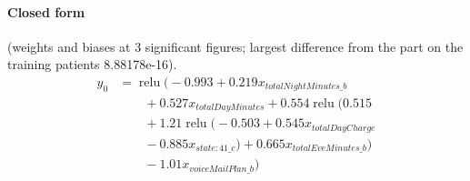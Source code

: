 \documentclass[a4paper,10pt]{article}
\newif\ifreviewmarks
\newcommand{\reviewrule}{\noindent{\color{BrickRed}\rule{\linewidth}{0.8pt}}}
\newenvironment{drafted}[1][]{%
  \ifreviewmarks\par\addvspace{\medskipamount}\reviewrule\par\nopagebreak
  \noindent{\color{BrickRed}\sffamily\footnotesize\textbf{Thesis Draft}\quad #1\hfill review}\par\nopagebreak\smallskip\fi}{%
  \ifreviewmarks\par\smallskip\noindent{\color{BrickRed}\sffamily\footnotesize end of thesis draft}\par\nopagebreak\reviewrule\par\medskip\fi}
\begin{document}
\begin{drafted}[plain-language layer: churn100-s7-c1]
\paragraph{Closed form} {\footnotesize(weights and biases at 3 significant figures; largest difference from the part on the training patients 8.88178e-16).}
{\small\begingroup\allowdisplaybreaks
\begin{align*}
y_{0} &= \operatorname{relu}\bigl(-0.993 + 0.219 x_{totalNightMinutes\_b} \\
&\qquad + 0.527 x_{totalDayMinutes} + 0.554 \operatorname{relu}\bigl(0.515 \\
&\qquad + 1.21 \operatorname{relu}\bigl(-0.503 + 0.545 x_{totalDayCharge} \\
&\qquad - 0.885 x_{state:41\_c}\bigr) + 0.665 x_{totalEveMinutes\_b}\bigr) \\
&\qquad - 1.01 x_{voiceMailPlan\_b}\bigr)
\end{align*}\endgroup}


\end{drafted}
\end{document}
